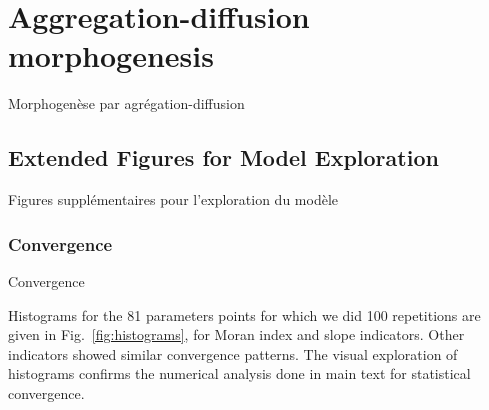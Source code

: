 





\newpage

\section{Aggregation-diffusion morphogenesis}{Morphogenèse par agrégation-diffusion}

\label{app:sec:density}




\subsection{Extended Figures for Model Exploration}{Figures supplémentaires pour l'exploration du modèle}


\subsubsection{Convergence}{Convergence}

Histograms for the 81 parameters points for which we did 100 repetitions are given in Fig.~\ref{fig:histograms}, for Moran index and slope indicators. Other indicators showed similar convergence patterns. The visual exploration of histograms confirms the numerical analysis done in main text for statistical convergence.





